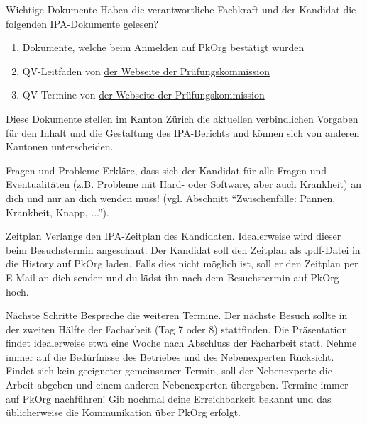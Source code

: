 \begin{taskitem}{Wichtige Dokumente}
  Haben die verantwortliche Fachkraft und der Kandidat die folgenden IPA-Dokumente gelesen?
  \begin{enumerate}
    \item Dokumente, welche beim Anmelden auf PkOrg bestätigt wurden
    \item QV-Leitfaden von \href{https://pk19.ch/informatiker-efz/download-div-files-2/}{der Webseite der Prüfungskommission}
    \item QV-Termine von \href{https://pk19.ch/informatiker-efz/download-div-files-2/}{der Webseite der Prüfungskommission}
  \end{enumerate}
  Diese Dokumente stellen im Kanton Zürich die aktuellen verbindlichen Vorgaben für den Inhalt und die Gestaltung des IPA-Berichts und können sich von anderen Kantonen unterscheiden.
\end{taskitem}
\begin{taskitem}{Fragen und Probleme}
  Erkläre, dass sich der Kandidat für alle Fragen und Eventualitäten (z.B. Probleme mit Hard- oder Software, aber auch Krankheit) an dich und nur an dich wenden muss! (vgl. Abschnitt \enquote{Zwischenfälle: Pannen, Krankheit, Knapp, ...}).
\end{taskitem}
\begin{taskitem}{Zeitplan}
  Verlange den IPA-Zeitplan des Kandidaten. Idealerweise wird dieser beim Besuchstermin angeschaut. Der Kandidat soll den Zeitplan als .pdf-Datei in die History auf PkOrg laden. Falls dies nicht möglich ist, soll er den Zeitplan per E-Mail an dich senden und du lädst ihn nach dem Besuchstermin auf PkOrg hoch.
\end{taskitem}
\begin{taskitem}{Nächste Schritte}
  Bespreche die weiteren Termine. Der nächste Besuch sollte in der zweiten Hälfte der Facharbeit (Tag 7 oder 8) stattfinden. Die Präsentation findet idealerweise etwa eine Woche nach Abschluss der Facharbeit statt. Nehme immer auf die Bedürfnisse des Betriebes und des Nebenexperten Rücksicht. Findet sich kein geeigneter gemeinsamer Termin, soll der Nebenexperte die Arbeit abgeben und einem anderen Nebenexperten übergeben. Termine immer auf PkOrg nachführen!
  Gib nochmal deine Erreichbarkeit bekannt und das üblicherweise die Kommunikation über PkOrg erfolgt.
\end{taskitem}